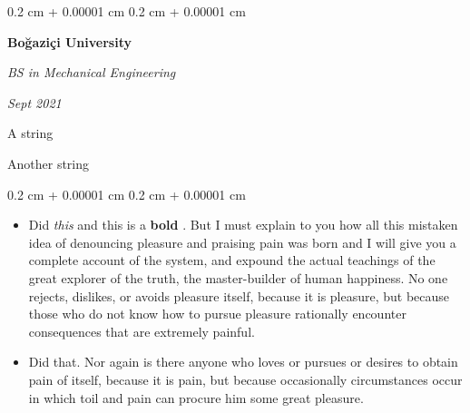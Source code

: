 \documentclass[10pt, letterpaper]{article}
\newenvironment{summary}{
    \begin{description}[
        topsep=0.10 cm,
        parsep=0.10 cm,
        partopsep=0pt,
        itemsep=0pt,
        leftmargin=0.4 cm + 10pt
    ]
}{
    \end{description}
} %
\newenvironment{highlights}{
    \begin{itemize}[
        topsep=0.10 cm,
        parsep=0.10 cm,
        partopsep=0pt,
        itemsep=0pt,
        leftmargin=0.4 cm + 10pt
    ]
}{
    \end{itemize}
} %
\newenvironment{onecolentry}{
    \begin{adjustwidth}{
        0.2 cm + 0.00001 cm
    }{
        0.2 cm + 0.00001 cm
    }
}{
    \end{adjustwidth}
} %
\newenvironment{twocolentry}[2][]{
    \onecolentry
    \def\secondColumn{#2}
    \setcolumnwidth{\fill, 4.5 cm}
    \begin{paracol}{2}
}{
    \switchcolumn \raggedleft \secondColumn
    \end{paracol}
    \endonecolentry
} %
\let\hrefWithoutArrow\href
\renewcommand{\href}[2]{\hrefWithoutArrow{#1}{\ifthenelse{\equal{#2}{}}{ }{#2 }\raisebox{.15ex}{\footnotesize \faExternalLink*}}}
\begin{document}
        \begin{twocolentry}{
            
            
        \textit{Sept 2021}}
            \textbf{Boğaziçi University}

            \textit{BS in Mechanical Engineering}
        \end{twocolentry}
            \begin{summary}
                \item A string
                \item Another string
            \end{summary}
        \vspace{0.10 cm}
        \begin{onecolentry}
            \begin{highlights}
                \item Did \textit{this} and this is a \textbf{bold} \href{https://example.com}{link}. But I must explain to you how all this mistaken idea of denouncing pleasure and praising pain was born and I will give you a complete account of the system, and expound the actual teachings of the great explorer of the truth, the master-builder of human happiness. No one rejects, dislikes, or avoids pleasure itself, because it is pleasure, but because those who do not know how to pursue pleasure rationally encounter consequences that are extremely painful.
                \item Did that. Nor again is there anyone who loves or pursues or desires to obtain pain of itself, because it is pain, but because occasionally circumstances occur in which toil and pain can procure him some great pleasure.
            \end{highlights}
        \end{onecolentry}


        \vspace{0.2 cm}
\end{document}
